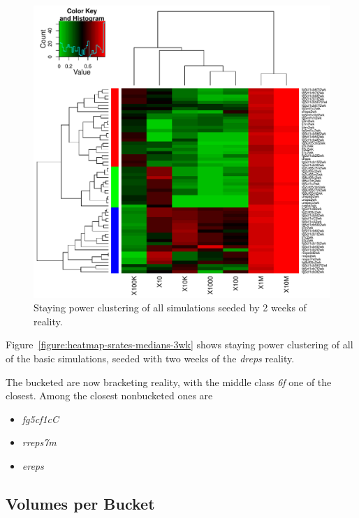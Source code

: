 \documentclass[10pt,oneside]{memoir}
\begin{document}
\begin{Spacing}{2}
\begin{figure}
\begin{center}
    \includegraphics{figures/crop/heatmap-srates-medians-2wk}
    \caption{Staying power clustering of all simulations seeded by 2 weeks of reality.}
    \label{figure:heatmap-srates-medians-2wk}
\end{center}
\end{figure}
Figure~\ref{figure:heatmap-srates-medians-3wk} shows staying power clustering of all of the basic simulations, seeded with two weeks of the {\itshape dreps} reality.


The bucketed are now bracketing reality, with the middle class {\itshape 6f} one of the closest.  Among the closest nonbucketed ones are


\begin{itemize}


\item {\itshape fg5cf1cC}

\item {\itshape rreps7m}

\item {\itshape ereps}
\end{itemize}

\pagebreak \subsection{Volumes per Bucket}
\label{volumesperbucket}


\end{Spacing}
\end{document}
